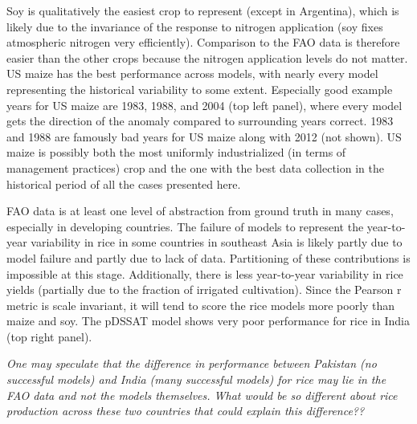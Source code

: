\documentclass[preprint, 5p, times, twocolumn]{elsarticle}
\begin{document}
{Soy is qualitatively the easiest crop to represent (except in Argentina), which is likely due to the invariance of the response to nitrogen application (soy fixes atmospheric nitrogen very efficiently). Comparison to the FAO data is therefore easier than the other crops because the nitrogen application levels do not matter. US maize has the best performance across models, with nearly every model representing the historical variability to some extent. Especially good example years for US maize are 1983, 1988, and 2004 (top left panel), where every model gets the direction of the anomaly compared to surrounding years correct. 1983 and 1988 are famously bad years for US maize along with 2012 (not shown). US maize is possibly both the most uniformly industrialized (in terms of management practices) crop and the one with the best data collection in the historical period of all the cases presented here.

FAO data is at least one level of abstraction from ground truth in many cases, especially in developing countries. The failure of models to represent the year-to-year variability in rice in some countries in southeast Asia is likely partly due to model failure and partly due to lack of data. Partitioning of these contributions is impossible at this stage. Additionally, there is less year-to-year variability in rice yields (partially due to the fraction of irrigated cultivation). Since the Pearson r metric is scale invariant, it will tend to score the rice models more poorly than maize and soy. The pDSSAT model shows very poor performance for rice in India (top right panel).

\textit{One may speculate that the difference in performance between Pakistan (no successful models) and India (many successful models) for rice may lie in the FAO data and not the models themselves. What would be so different about rice production across these two countries that could explain this difference??}


}
\end{document}
